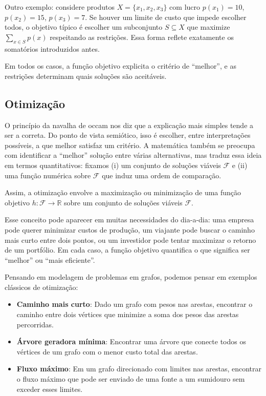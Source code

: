 Outro exemplo: considere produtos \(X=\{x_1,x_2,x_3\}\) com lucro \(p(x_1)=10\), \(p(x_2)=15\), \(p(x_3)=7\). Se houver um limite de custo que impede escolher todos, o objetivo típico é escolher um subconjunto \(S\subseteq X\) que maximize \(\sum_{x\in S} p(x)\) respeitando as restrições. Essa forma reflete exatamente os somatórios introduzidos antes.


Em todos os casos, a função objetivo explicita o critério de “melhor”, e as restrições determinam quais soluções são aceitáveis.

\subsection{Otimização}

O princípio da navalha de occam nos diz que a explicação mais simples tende a ser a correta. Do ponto de vista semiótico, isso é escolher, entre interpretações possíveis, a que melhor satisfaz um critério. A matemática também se preocupa com identificar a “melhor” solução entre várias alternativas, mas traduz essa ideia em termos quantitativos: fixamos (i) um conjunto de soluções viáveis \(\mathcal{F}\) e (ii) uma função numérica sobre \(\mathcal{F}\) que induz uma ordem de comparação.


Assim, a otimização envolve a maximização ou minimização de uma função objetivo \(h: \mathcal{F} \to \mathbb{R}\) sobre um conjunto de soluções viáveis \(\mathcal{F}\).


Esse conceito pode aparecer em muitas necessidades do dia-a-dia: uma empresa pode querer minimizar custos de produção, um viajante pode buscar o caminho mais curto entre dois pontos, ou um investidor pode tentar maximizar o retorno de um portfólio. Em cada caso, a função objetivo quantifica o que significa ser “melhor” ou “mais eficiente”.


Pensando em modelagem de problemas em grafos, podemos pensar em exemplos clássicos de otimização:

\begin{itemize}
	\item \textbf{Caminho mais curto}: Dado um grafo com pesos nas arestas, encontrar o caminho entre dois vértices que minimize a soma dos pesos das arestas percorridas.
	\item \textbf{Árvore geradora mínima}: Encontrar uma árvore que conecte todos os vértices de um grafo com o menor custo total das arestas.
	\item \textbf{Fluxo máximo}: Em um grafo direcionado com limites nas arestas, encontrar o fluxo máximo que pode ser enviado de uma fonte a um sumidouro sem exceder esses limites.
\end{itemize}

